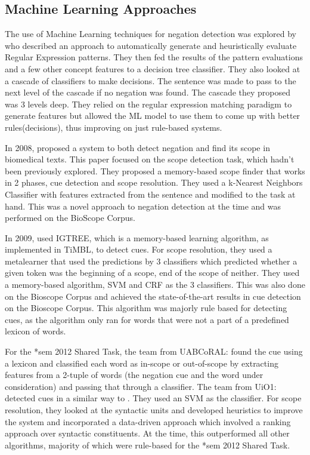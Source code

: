 \documentclass[10pt, a4paper]{article}
\begin{document}
\subsection{Machine Learning Approaches}

The use of Machine Learning techniques for negation detection was explored by  who described an approach to automatically generate and heuristically evaluate Regular Expression patterns. They then fed the results of the pattern evaluations and a few other concept features to a decision tree classifier. They also looked at a cascade of classifiers to make decisions. The sentence was made to pass to the next level of the cascade if no negation was found. The cascade they proposed was 3 levels deep. They relied on the regular expression matching paradigm to generate features but allowed the ML model to use them to come up with better rules(decisions), thus improving on just rule-based systems.
\par In 2008,  proposed a system to both detect negation and find its scope in biomedical texts. This paper focused on the scope detection task, which hadn’t been previously explored. They proposed a memory-based scope finder that works in 2 phases, cue detection and scope resolution. They used a k-Nearest Neighbors Classifier with features extracted from the sentence and modified to the task at hand. This was a novel approach to negation detection at the time and was performed on the BioScope Corpus.
\par In 2009,  used IGTREE, which is a memory-based learning algorithm, as implemented in TiMBL, to detect cues. For scope resolution, they used a metalearner that used the predictions by 3 classifiers which predicted whether a given token was the beginning of a scope, end of the scope of neither. They used a memory-based algorithm, SVM and CRF as the 3 classifiers. This was also done on the Bioscope Corpus and achieved the state-of-the-art results in cue detection on the Bioscope Corpus. This algorithm was majorly rule based for detecting cues, as the algorithm only ran for words that were not a part of a predefined lexicon of words.
\par For the *sem 2012 Shared Task, the team from UABCoRAL: \cite{gyawali-solorio-2012-uabcoral} found the cue using a lexicon and classified each word as in-scope or out-of-scope by extracting features from a 2-tuple of words (the negation cue and the word under consideration) and passing that through a classifier. The team from UiO1: \cite{read-etal-2012-uio1} detected cues in a similar way to . They used an SVM as the classifier. For scope resolution, they looked at the syntactic units and developed heuristics to improve the system and incorporated a data-driven approach which involved a ranking approach over syntactic constituents. At the time, this outperformed all other algorithms, majority of which were rule-based for the *sem 2012 Shared Task.
\end{document}
